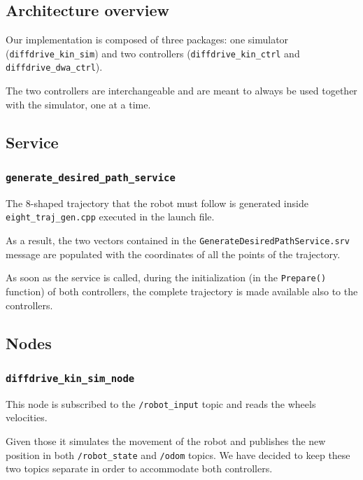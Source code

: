 \documentclass[11pt,a4paper]{article}
\begin{document}

\subsection{Architecture overview}

Our implementation is composed of three packages: one simulator (\texttt{diffdrive\_kin\_sim}) and two controllers (\texttt{diffdrive\_kin\_ctrl} and \texttt{diffdrive\_dwa\_ctrl}).

The two controllers are interchangeable and are meant to always be used together with the simulator, one at a time.

\subsection{Service}

\subsubsection{\texttt{generate\_desired\_path\_service}}

The 8-shaped trajectory that the robot must follow is generated inside \texttt{eight\_traj\_gen.cpp} executed in the launch file.

As a result, the two vectors contained in the \texttt{GenerateDesiredPathService.srv} message are populated with the coordinates of all the points of the trajectory.

As soon as the service is called, during the initialization (in the \texttt{Prepare()} function) of both controllers, the complete trajectory is made available also to the controllers.



\subsection{Nodes}

\subsubsection{\texttt{diffdrive\_kin\_sim\_node}}

This node is subscribed to the \texttt{/robot\_input} topic and reads the wheels velocities.

Given those it simulates the movement of the robot and publishes the new position in both \texttt{/robot\_state} and \texttt{/odom} topics. We have decided to keep these two topics separate in order to accommodate both controllers.\\
\end{document}
